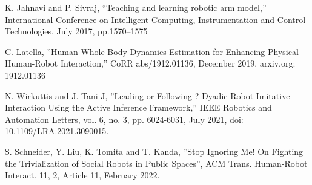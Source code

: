 \documentclass[conference]{IEEEtran}
\begin{document}
\begin{thebibliography}{00}
 K. Jahnavi and P. Sivraj, ``Teaching and learning robotic arm model,'' International Conference on Intelligent Computing, Instrumentation and Control Technologies, July 2017, pp.1570--1575

 C. Latella, ''Human Whole-Body Dynamics Estimation for Enhancing Physical Human-Robot Interaction,'' CoRR abs/1912.01136, December 2019. arxiv.org: 1912.01136

 N. Wirkuttis and J. Tani J, ''Leading or Following ? Dyadic Robot Imitative Interaction Using the Active Inference Framework,'' IEEE Robotics and Automation Letters, vol. 6, no. 3, pp. 6024-6031, July 2021, doi: 10.1109/LRA.2021.3090015.

 S. Schneider, Y. Liu, K. Tomita and T. Kanda, ''Stop Ignoring Me! On Fighting the Trivialization of Social Robots in Public Spaces'', ACM Trans. Human-Robot Interact. 11, 2, Article 11, February 2022.

\end{thebibliography}
\end{document}
